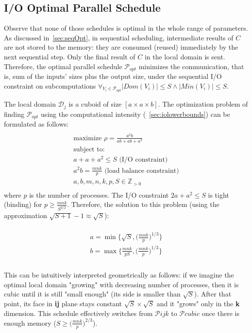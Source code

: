 \documentclass[sigplan,review,anonymous,10pt]{acmart}\settopmatter{printfolios=true,printccs=false,printacmref=false}
\begin{document}
\subsection{I/O Optimal Parallel Schedule}
\label{sec:parScheduling}

Observe that none of those schedules is optimal in the whole range of
parameters. As discussed in~\cref{sec:seqOpt}, in sequential scheduling, 
intermediate results of $C$ are not stored
to the memory: they are consumed (reused) immediately by the next
sequential step. Only the final result of $C$ in the local domain is sent.
Therefore, the optimal parallel schedule $\mathcal{P}_{opt}$ minimizes the
communication, that is, sum of the inputs' sizes plus the output size, under
the sequential I/O constraint on subcomputations $\forall_{V_i \in
\mathcal{P}_{opt}} |Dom(V_i)| \le S \land |Min(V_i)| \le S$.

The local domain $\mathcal{D}_j$ is a cuboid of size $[a \times a \times b]$. 
The optimization problem of finding $\mathcal{P}_{opt}$
using the 
computational intensity (~\cref{sec:iolowerbounds}) can be 
formulated as 
follows:
\begin{multline}
\label{eq:tileEq}
\\
\text{maximize } \rho = \frac{a^2b}{ab + ab + a^2}\\
\text{subject to: } \\
a + a + a^2 \le S \text{ (I/O constraint)} \\
a^2b = \frac{mnk}{p} \text{ (load balance constraint)} \\
a, b, m, n, k, p, S \in \mathbb{Z}_{> 0} \\
\end{multline}
where $p$ is the number of processes. The I/O constraint $2a + 
a^2 \le 
S$ is tight (binding) for $p \ge \frac{mnk}{S^{3/2}}$. Therefore, the solution 
to this problem (using the 
approximation $\sqrt{S+1} - 1 \approx \sqrt{S}$):

\begin{multline}
\\
a = \min\Big\{\sqrt{S}, \Big(\frac{mnk}{p}\Big)^{1/3} \Big\}\\
b = \max\Big\{\frac{mnk}{pS}, \Big(\frac{mnk}{p}\Big)^{1/3} \Big\}\\
\label{eq:optTileShape}
\end{multline}
\\

This can be intuitively interpreted geometrically as follows: if we 
imagine the 
optimal local domain "growing" with decreasing number of processes, 
then it is 
cubic until it is still "small enough" (its side is smaller than 
$\sqrt{S}$). 
After that point, its face in \textbf{ij} plane stays constant 
$\sqrt{S} \times 
\sqrt{S}$ and it "grows" 
only in the \textbf{k} dimension. This schedule effectively switches 
from $\mathcal{P}ijk$ to $\mathcal{P}cubic$ once there is enough 
memory ($S \ge \big(\frac{mnk}{p}\big)^{2/3}$).
\end{document}
